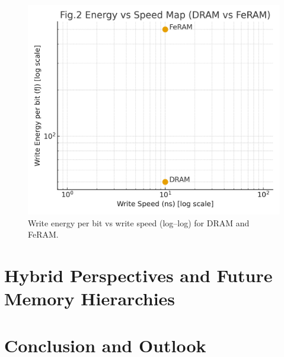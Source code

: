 \documentclass[journal]{IEEEtran}
\begin{document}
\begin{figure}[!t]
\centering
\includegraphics[width=\linewidth]{fig2_energy_vs_speed.png}
\caption{Write energy per bit vs write speed (log--log) for DRAM and FeRAM.}
\label{fig:evs}
\end{figure}

\section{Hybrid Perspectives and Future Memory Hierarchies}


\section{Conclusion and Outlook}




\end{document}
